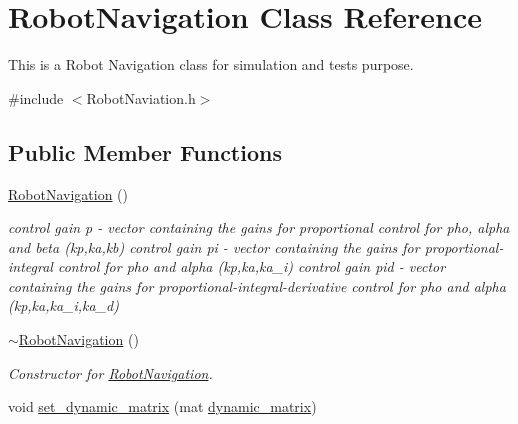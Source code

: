 \hypertarget{class_robot_navigation}{}\section{Robot\+Navigation Class Reference}
\label{class_robot_navigation}


This is a Robot Navigation class for simulation and tests purpose.  




{\ttfamily \#include $<$Robot\+Naviation.\+h$>$}

\subsection*{Public Member Functions}
\begin{DoxyCompactItemize}
\item 
\mbox{\label{class_robot_navigation_a949517ad58b54558b5e97fb7154f185b}} 
\hyperlink{class_robot_navigation_a949517ad58b54558b5e97fb7154f185b}{Robot\+Navigation} ()
\begin{DoxyCompactList}\small\item\em control gain p -\/ vector containing the gains for proportional control for pho, alpha and beta (kp,ka,kb) control gain pi -\/ vector containing the gains for proportional-\/integral control for pho and alpha (kp,ka,ka\+\_\+i) control gain pid -\/ vector containing the gains for proportional-\/integral-\/derivative control for pho and alpha (kp,ka,ka\+\_\+i,ka\+\_\+d) \end{DoxyCompactList}\item 
\mbox{\label{class_robot_navigation_af29a5bb696c20ee7c8ced94f2c33b893}} 
\hyperlink{class_robot_navigation_af29a5bb696c20ee7c8ced94f2c33b893}{$\sim$\+Robot\+Navigation} ()
\begin{DoxyCompactList}\small\item\em Constructor for \hyperlink{class_robot_navigation}{Robot\+Navigation}. \end{DoxyCompactList}\item 
\mbox{\label{class_robot_navigation_aaed78c0f698c9f29760979b654caa162}} 
void \hyperlink{class_robot_navigation_aaed78c0f698c9f29760979b654caa162}{set\+\_\+dynamic\+\_\+matrix} (mat \hyperlink{class_robot_navigation_a1aad778b34e54f7fc85ec3ed744a444c}{dynamic\+\_\+matrix})

\end{DoxyCompactItemize}
